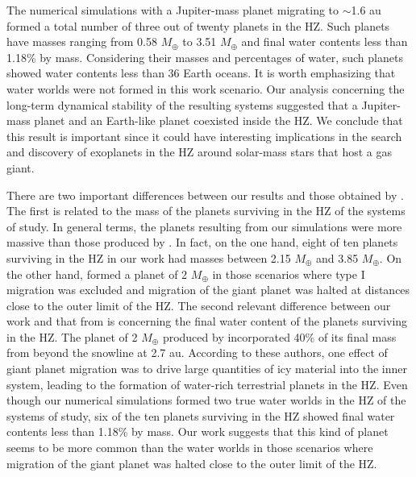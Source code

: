 \documentclass{aa}
\begin{document}
The numerical simulations with a Jupiter-mass planet migrating to $\sim$1.6 au formed a total number of three out of twenty planets
in the HZ. Such planets have masses ranging from 0.58 $M_{\oplus}$ to 3.51 $M_{\oplus}$ and final water contents less than 1.18\% by mass.
Considering their masses and percentages of water, such planets showed water contents less than 36 Earth oceans. It is worth emphasizing that
water worlds were not formed in this work scenario. Our analysis concerning the long-term dynamical stability of the resulting systems
suggested that a Jupiter-mass planet and an Earth-like planet coexisted inside the HZ. We conclude that this result is important
since it could have interesting implications in the search and discovery of exoplanets in the HZ around solar-mass stars that host a gas
giant.

There are two important differences between our results and those obtained by \citet{Fogg2009}. The first is related to
the mass of the planets surviving in the HZ of the systems of study. In general terms, the planets resulting from our simulations were
more massive than those produced by \citet{Fogg2009}. In fact, on the one hand, eight of ten planets surviving in the HZ in our
work had masses between 2.15 $M_\oplus$ and 3.85 $M_\oplus$. On the other hand, \citet{Fogg2009} formed a planet of
2 $M_\oplus$ in those scenarios where type I migration was excluded and migration of the giant planet was halted at distances close
to the outer limit of the HZ. The second relevant difference between our work and that from \citet{Fogg2009} is concerning
the final water content of the planets surviving in the HZ. The planet of 2 $M_\oplus$ produced by \citet{Fogg2009}
incorporated 40\% of its final mass from beyond the snowline at 2.7 au. According to these authors, one effect of giant planet migration
was to drive large quantities of icy material into the inner system, leading to the formation of water-rich terrestrial planets in the HZ.
Even though our numerical simulations formed two true water worlds in the HZ of the systems of study, six of the ten planets surviving in
the HZ showed final water contents less than 1.18\% by mass. Our work suggests that this kind of planet seems to be more common
than the water worlds in those scenarios where migration of the giant planet was halted close to the outer limit of the HZ.
\end{document}
